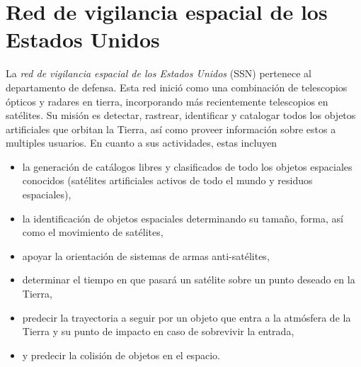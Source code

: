 \section*{Red de vigilancia espacial de los Estados Unidos}


La \emph{red de vigilancia espacial de los Estados Unidos} (SSN) pertenece al departamento de defensa.
Esta red inició como una combinación de telescopios ópticos y radares en tierra, incorporando más recientemente telescopios en satélites.
Su misión es detectar, rastrear, identificar y catalogar todos los objetos artificiales que orbitan la Tierra, así como proveer información sobre estos a multiples usuarios.\cite{SSN_chatters_2009}
En cuanto a sus actividades,
estas incluyen
%
\begin{itemize}
	\item la generación de catálogos libres y clasificados de todo los objetos espaciales conocidos (satélites artificiales activos de todo el mundo y residuos espaciales),
	\item la identificación de objetos espaciales determinando su tamaño, forma, así como el movimiento de satélites,
	\item apoyar la orientación de sistemas de armas anti-satélites,
	\item determinar el tiempo en que pasará un satélite sobre un punto deseado en la Tierra,
	\item predecir la trayectoria a seguir por un objeto que entra a la atmósfera de la Tierra y su punto de impacto en caso de sobrevivir la entrada,
	\item y predecir la colisión de objetos en el espacio.\cite{detect_and_track}
\end{itemize}
